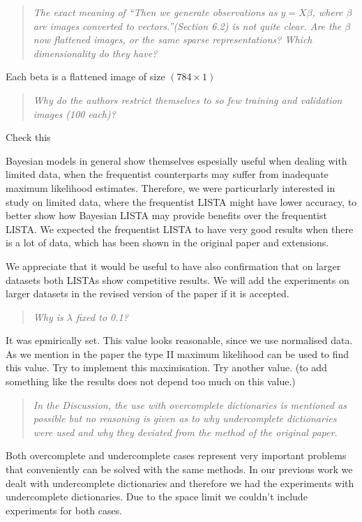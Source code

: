 \documentclass{article}
\begin{document}
\begin{quote}
\textit{The exact meaning of “Then we generate observations as $y = X \beta$, where $\beta$ are images converted to vectors.”(Section 6.2) is not quite clear. Are the $\beta$ now flattened images, or the same sparse representations? Which dimensionality do they have?}
\end{quote}
Each beta is a flattened image of size $(784 \times 1)$

\begin{quote}
\textit{Why do the authors restrict themselves to so few training and validation images (100 each)?}
\end{quote}
Check this

Bayesian models in general show themselves espesially useful when dealing with limited data, when the frequentist counterparts may suffer from inadequate maximum likelihood estimates. Therefore, we were particurlarly interested in study on limited data, where the frequentist LISTA might have lower accuracy, to better show how Bayesian LISTA may provide benefits over the frequentist LISTA. We expected the frequentist LISTA to have very good results when there is a lot of data, which has been shown in the original paper and extensions.

We appreciate that it would be useful to have also confirmation that on larger datasets both LISTAs show competitive results. We will add the experiments on larger datasets in the revised version of the paper if it is accepted.

\begin{quote}
\textit{Why is $\lambda$ fixed to 0.1?}
\end{quote}
It was epmirically set. This value looks reasonable, since we use normalised data. As we mention in the paper the type II maximum likelihood can be used to find this value.
Try to implement this maximisation.
Try another value. (to add something like the results does not depend too much on this value.)

\begin{quote}
\textit{In the Discussion, the use with overcomplete dictionaries is mentioned as possible but no reasoning is given as to why undercomplete dictionaries were used and why they deviated from the method of the original paper.}
\end{quote}
Both overcomplete and undercomplete cases represent very important problems that conveniently can be solved with the same methods. In our previous work we dealt with undercomplete dictionaries and therefore we had the experiments with undercomplete dictionaries. Due to the space limit we couldn't include experiments for both cases. 
\end{document}
